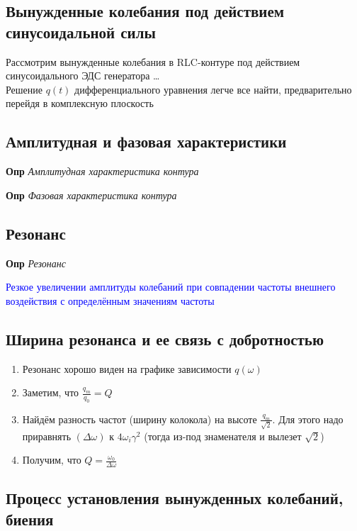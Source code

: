 \documentclass[a4paper, 14pt]{article}
\begin{document}
    \subsection{Вынужденные колебания под действием синусоидальной силы}
    
    Рассмотрим вынужденные колебания в RLC-контуре под действием синусоидального ЭДС генератора \ldots \\
    Решение $q(t)$ дифференциального уравнения легче все найти, предварительно перейдя в комплексную плоскость
    
    \subsection{Амплитудная и фазовая характеристики}
    
    \textbf{Опр} \textit{Амплитудная характеристика контура}
    
    \textbf{Опр} \textit{Фазовая характеристика контура}
    
    \subsection{Резонанс}
    
    \textbf{Опр} \textit{Резонанс}
    
    \textcolor{blue}{Резкое увеличении амплитуды колебаний при совпадении частоты внешнего воздействия с
    определённым значениям частоты}
    
    \subsection{Ширина резонанса и ее связь с добротностью}
    
    \begin{enumerate}
        \item Резонанс хорошо виден на графике зависимости $q(\omega)$
        \item Заметим, что $\frac{q_m}{q_0} = Q$
        \item Найдём разность частот (ширину колокола) на высоте $\frac{q_m}{\sqrt{2}}$.
        Для этого надо приравнять $(\Delta \omega)$ к $4 \omega_i \gamma^2$ (тогда из-под знаменателя и вылезет $\sqrt{2}$)
        \item Получим, что $Q = \frac{\omega_0}{\Delta \omega}$
    \end{enumerate}
    
    \subsection{Процесс установления вынужденных колебаний, биения}
    
\end{document}
